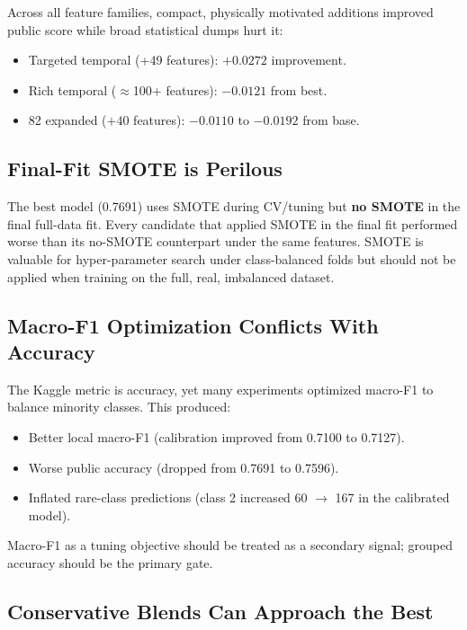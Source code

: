 \documentclass[12pt, a4paper]{article}
\begin{document}
Across all feature families, compact, physically motivated additions improved public score while broad statistical dumps hurt it:

\begin{itemize}
    \item Targeted temporal (+49 features): $+0.0272$ improvement.
    \item Rich temporal ($\approx$100+ features): $-0.0121$ from best.
    \item 82 expanded ($+40$ features): $-0.0110$ to $-0.0192$ from base.
\end{itemize}

\subsection{Final-Fit SMOTE is Perilous}

The best model (0.7691) uses SMOTE during CV/tuning but \textbf{no SMOTE} in the final full-data fit. Every candidate that applied SMOTE in the final fit performed worse than its no-SMOTE counterpart under the same features. SMOTE is valuable for hyper-parameter search under class-balanced folds but should not be applied when training on the full, real, imbalanced dataset.

\subsection{Macro-F1 Optimization Conflicts With Accuracy}

The Kaggle metric is accuracy, yet many experiments optimized macro-F1 to balance minority classes. This produced:

\begin{itemize}
    \item Better local macro-F1 (calibration improved from 0.7100 to 0.7127).
    \item Worse public accuracy (dropped from 0.7691 to 0.7596).
    \item Inflated rare-class predictions (class 2 increased 60 $\rightarrow$ 167 in the calibrated model).
\end{itemize}

Macro-F1 as a tuning objective should be treated as a secondary signal; grouped accuracy should be the primary gate.

\subsection{Conservative Blends Can Approach the Best}
\end{document}
